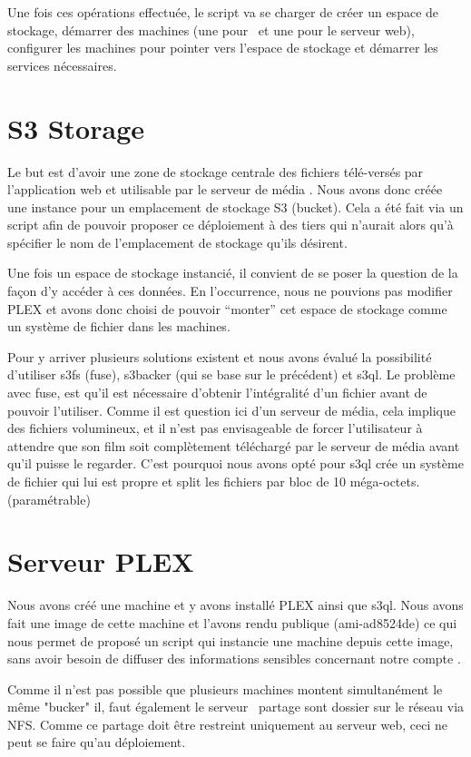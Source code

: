 \documentclass[french]{msereport}
\newcommand{\aws}{\brand{Amazon Web Services}}
\newcommand{\plex}{\brand{PLEX}}
\begin{document}
		Une fois ces opérations effectuée, le script va se charger de créer un espace de stockage, démarrer des machines (une pour \plex\ et une pour le serveur web), configurer les machines pour pointer vers l’espace de stockage et démarrer les services nécessaires.
	
	\section{S3 Storage }
		Le but est d’avoir une zone de stockage centrale des fichiers télé-versés par l’application web et utilisable par le serveur de média \plex. Nous avons donc créée une instance pour un emplacement de stockage S3 (bucket). Cela a été fait via un script afin de pouvoir proposer ce déploiement à des tiers qui n’aurait alors qu’à spécifier le nom de l’emplacement de stockage qu’ils désirent.
		
		Une fois un espace de stockage instancié, il convient de se poser la question de la façon d’y accéder à ces données. En l'occurrence, nous ne pouvions pas modifier PLEX et avons donc choisi de pouvoir “monter” cet espace de stockage comme un système de fichier dans les machines.
		
		Pour y arriver plusieurs solutions existent et nous avons évalué la possibilité d'utiliser s3fs (fuse), s3backer (qui se base sur le précédent) et s3ql. Le problème avec fuse, est qu’il est nécessaire d’obtenir l’intégralité d’un fichier avant de pouvoir l’utiliser. Comme il est question ici d’un serveur de média, cela implique des fichiers volumineux, et il n’est pas envisageable de forcer l’utilisateur à attendre que son film soit complètement téléchargé par le serveur de média avant qu’il puisse le regarder. C’est pourquoi nous avons opté pour s3ql crée un système de fichier qui lui est propre et split les fichiers par bloc de 10 méga-octets. (paramétrable)
	
	\section{Serveur PLEX}		
		Nous avons créé une machine et y avons installé PLEX ainsi que s3ql. Nous avons fait une image de cette machine et l’avons rendu publique (ami-ad8524de) ce qui nous permet de proposé un script qui instancie une machine depuis cette image, sans avoir besoin de diffuser des informations sensibles concernant notre compte \aws.
				
		Comme il n'est pas possible que plusieurs machines montent simultanément le même "bucker" il, faut également le serveur \plex\ partage sont dossier sur le réseau via NFS. Comme ce partage doit être restreint uniquement au serveur web, ceci ne peut se faire qu'au déploiement.
		
\end{document}

